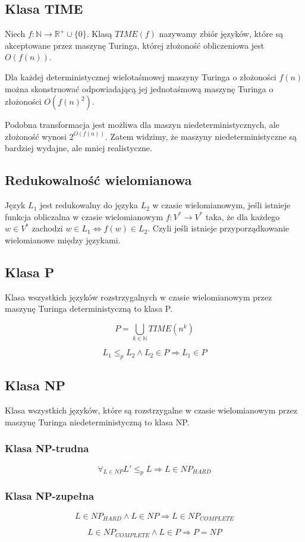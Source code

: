 \documentclass{../notatki}
\begin{document}
\subsection{Klasa TIME}

Niech $f: \mathbb{N} \rightarrow \mathbb{R}^+ \cup \{0\}$. Klasą $TIME(f)$
nazywamy zbiór języków, które są akceptowane przez maszynę Turinga, której
złożoność obliczeniowa jest $O(f(n))$.

Dla każdej deterministycznej wielotaśmowej maszyny Turinga o złożoności $f(n)$
można skonstruować odpowiadającą jej jednotaśmową maszynę Turinga o złożoności
$O(f(n)^2)$.

Podobna transformacja jest możliwa dla maszyn niedeterministycznych, ale
złożoność wynosi $2^{O(f(n))}$. Zatem widzimy, że maszyny niedeterministyczne
są bardziej wydajne, ale mniej realistyczne.

\subsection{Redukowalność wielomianowa}

Język $L_1$ jest redukowalny do języka $L_2$ w czasie wielomianowym, jeśli
istnieje funkcja obliczalna w czasie wielomianowym $f: V^*
\rightarrow V^*$ taka,
że dla każdego $w \in V^*$ zachodzi $w \in L_1 \Leftrightarrow f(w) \in L_2$.
Czyli jeśli istnieje przyporządkowanie wielomianowe między językami.

\subsection{Klasa P}

Klasa wszystkich języków rozstrzygalnych w czasie wielomianowym przez maszynę
Turinga deterministyczną to klasa P.

$$
P = \bigcup_{k \in \mathbb{N}} TIME(n^k)
$$

$$
L_1 \le_p L_2 \land L_2 \in P \Rightarrow L_1 \in P
$$

\subsection{Klasa NP}

Klasa wszystkich języków, które są rozstrzygalne w czasie wielomianowym przez
maszynę Turinga niedeterministyczną to klasa NP.

\subsubsection{Klasa NP-trudna}

$$
\forall_{L \in NP} L' \le_p L \Rightarrow L \in NP_{HARD}
$$

\subsubsection{Klasa NP-zupełna}

$$
L \in NP_{HARD} \land L \in NP \Rightarrow L \in NP_{COMPLETE}
$$

$$
L \in NP_{COMPLETE} \land L \in P \Rightarrow P = NP
$$
\end{document}
